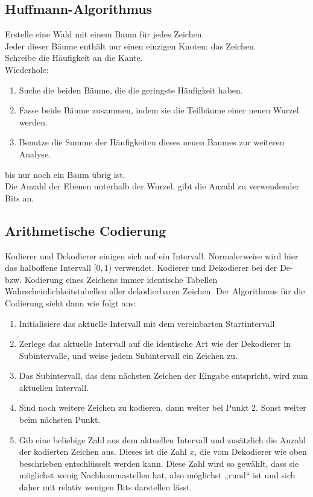 \subsection{Huffmann-Algorithmus}
Erstelle eine Wald mit einem Baum für jedes Zeichen.\\
Jeder dieser Bäume enthält nur einen einzigen Knoten: das Zeichen.\\ 
Schreibe die Häufigkeit an die Kante.\\
Wiederhole:
\begin{enumerate}
	\item Suche die beiden Bäume, die die geringste Häufigkeit haben.
	\item Fasse beide Bäume zusammen, indem sie die Teilbäume einer neuen Wurzel werden.
	\item Benutze die Summe der Häufigkeiten dieses neuen Baumes zur weiteren Analyse.
\end{enumerate}
bis nur noch ein Baum übrig ist.\\
Die Anzahl der Ebenen unterhalb der Wurzel, gibt die Anzahl zu verwendender Bits an.

\subsection{Arithmetische Codierung}
Kodierer und Dekodierer einigen sich auf ein Intervall. Normalerweise wird hier das halboffene Intervall $[0,1)$ verwendet.
Kodierer und Dekodierer bei der De- bzw. Kodierung eines Zeichens immer identische Tabellen 
Wahrscheinlichkeitstabellen aller dekodierbaren Zeichen. Der Algorithmus für die Codierung sieht dann wie folgt aus:
\begin{enumerate}
	\item Initialisiere das aktuelle Intervall mit dem vereinbarten Startintervall
	\item Zerlege das aktuelle Intervall auf die identische Art wie der Dekodierer in Subintervalle, 
		und weise jedem Subintervall ein Zeichen zu.
	\item Das Subintervall, das dem nächsten Zeichen der Eingabe entspricht, wird zum aktuellen Intervall.
	\item Sind noch weitere Zeichen zu kodieren, dann weiter bei Punkt 2. Sonst weiter beim nächsten Punkt.
	\item Gib eine beliebige Zahl aus dem aktuellen Intervall und zusätzlich die Anzahl der kodierten Zeichen aus. 
	Dieses ist die Zahl $x$, die vom Dekodierer wie oben beschrieben entschlüsselt werden kann. 
	Diese Zahl wird so gewählt, dass sie möglichst wenig Nachkommastellen hat, also möglichst „rund“ ist 
	und sich daher mit relativ wenigen Bits darstellen lässt.
\end{enumerate}


